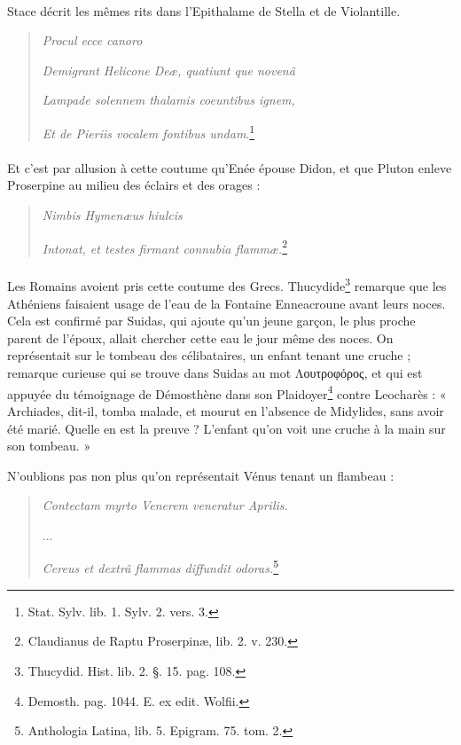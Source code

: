 \documentclass[a4paper, 18pt, oneside]{article}
\begin{document}
\paragraph{}
Stace décrit les mêmes rits dans l'Epithalame de Stella et de Violantille.
\begin{quotation}
\hspace*{10mm}\emph{Procul ecce canoro}

\emph{Demigrant Helicone Deæ, quatiunt que novenâ}

\emph{Lampade solennem thalamis coeuntibus ignem,}

\emph{Et de Pieriis vocalem fontibus undam}.\footnote{Stat. Sylv. lib. 1. Sylv. 2. vers. 3.}
\end{quotation}
\paragraph{}
Et c'est par allusion à cette coutume qu'Enée épouse Didon, et que Pluton enleve Proserpine au milieu des éclairs et des orages :
\begin{quotation}
\hspace*{10mm}\emph{Nimbis Hymenæus hiulcis}

\emph{Intonat, et testes firmant connubia flammæ.}\footnote{Claudianus de Raptu Proserpinæ, lib. 2. v. 230.}
\end{quotation}
\paragraph{}
Les Romains avoient pris cette coutume des Grecs. Thucydide\footnote{Thucydid. Hist. lib. 2. §. 15. pag. 108.} remarque que les Athéniens faisaient usage de l'eau de la Fontaine Enneacroune avant leurs noces. Cela est confirmé par Suidas, qui ajoute qu'un jeune garçon, le plus proche parent de l'époux, allait chercher cette eau le jour même des noces. On représentait sur le tombeau des célibataires, un enfant tenant une cruche ; remarque curieuse qui se trouve dans Suidas au mot Λουτροφόρος, et qui est appuyée du témoignage de Démosthène dans son Plaidoyer\footnote{Demosth. pag. 1044. E. ex edit. Wolfii.} contre Leocharès : « Archiades, dit-il, tomba malade, et mourut en l'absence de Midylides, sans avoir été marié. Quelle en est la preuve ? L'enfant qu'on voit une cruche à la main sur son tombeau. »

N'oublions pas non plus qu'on représentait Vénus tenant un flambeau :
\begin{quotation}
\emph{Contectam myrto Venerem veneratur Aprilis.}

...

\emph{Cereus et dextrâ flammas diffundit odoras.}\footnote{Anthologia Latina, lib. 5. Epigram. 75. tom. 2.}
\end{quotation}
\end{document}
